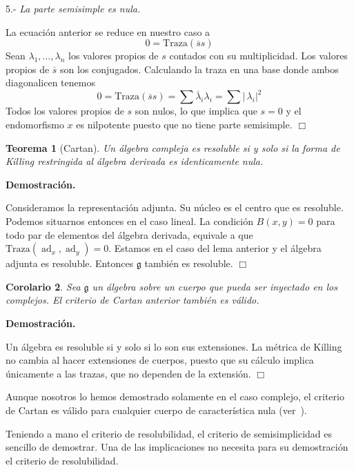 \documentclass[a4paper,draft,12pt]{article}
\newtheorem{teo}{Teorema}[section]%
\newtheorem{cor}[teo]{Corolario}%
\newcommand{\dem}{\noindent \textbf{Demostración. }\vspace{0.3 cm}}%
\newcommand{\g}{\mathfrak{g}}%
\newcommand{\fin}{ $\Box $ \vspace{0.4 cm}}
\newcommand{\abs}[1]{\left|\, #1 \right|}  %
\DeclareMathOperator{\ad}{ad}  %
\begin{document}
 5.- \textit{La parte semisimple es nula.}
 
 La ecuación anterior se reduce en nuestro caso a 
 $$
 0= \mathrm{Traza}(\overline{s}s)
 $$
 Sean $\lambda_1, \dots,\lambda_n$ los valores propios de $s$ contados con su multiplicidad.  Los valores propios de $\overline{s}$ son los conjugados.  Calculando la traza en una base donde ambos diagonalicen tenemos
 $$
  0= \mathrm{Traza}(\overline{s}s)= \textstyle \sum \overline{\lambda}_i\lambda_i = \sum \abs{\lambda_i}^2
  $$
  Todos los valores propios de $s$ son nulos, lo que implica que $s=0$ y el endomorfismo $x$ es nilpotente puesto que no tiene parte semisimple.  \fin
 
 \begin{teo}[Cartan]
 
 Un álgebra compleja es resoluble si y solo si la forma de Killing restringida al álgebra derivada es identicamente nula.
 
 \end{teo}
 
 \dem
 
 
 Consideramos la representación adjunta.  Su núcleo es el centro que es resoluble.  Podemos situarnos entonces en el caso lineal.  La condición $B(x,y)=0$ para todo par de elementos del álgebra derivada, equivale a que $\mathrm{Traza}(\ad_x,\ad_y)=0$.  Estamos en el caso del lema anterior y el álgebra adjunta es resoluble.  Entonces $\g$ también es resoluble. \fin
 
 
 \begin{cor}
 
 Sea $\g$ un álgebra sobre un cuerpo que pueda ser inyectado en los complejos.  El criterio de Cartan anterior también es válido.
 
 \end{cor}
 
 \dem
 
 Un álgebra  es resoluble si y solo si lo son sus extensiones.  La métrica de Killing no cambia al hacer extensiones de cuerpos, puesto que su cálculo implica únicamente a las trazas, que no dependen de la extensión.  \fin
 
 
 Aunque nosotros lo hemos demostrado solamente en el caso complejo, el criterio de Cartan es válido para cualquier cuerpo de característica nula (ver~\cite{humint}).
 
 \bigskip
 
 
 
Teniendo a mano el criterio de resolubilidad, el criterio de semisimplicidad es sencillo de demostrar. Una de las implicaciones no necesita para su demostración el criterio de resolubilidad.
\end{document}
